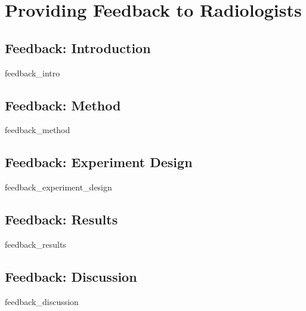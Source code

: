 \chapter{Providing Feedback to Radiologists}

\section{Feedback: Introduction}
{feedback_intro}
\clearpage

\section{Feedback: Method}
{feedback_method}
\clearpage

\section{Feedback: Experiment Design}
{feedback_experiment_design}
\clearpage

\section{Feedback: Results}
{feedback_results}
\clearpage

\section{Feedback: Discussion}
{feedback_discussion}